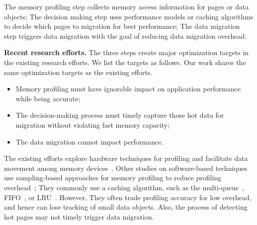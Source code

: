 The memory profiling step collects memory access information for pages or data objects; The decision making step uses performance models or caching algorithms to decide which pages to migration for best performance; The data migration step triggers data migration with the goal of reducing data migration overhead.

\textbf{Recent research efforts.}
The three steps create major optimization targets in the existing research efforts. We list the targets as follows. Our work shares the same optimization targets as the existing efforts.
\begin{itemize}[leftmargin=*]
    \item Memory profiling must have ignorable impact on application performance while being accurate;
    \item The decision-making process must timely capture those hot data for migration without violating fast memory capacity;
    \item The data migration cannot impact  performance. %
\end{itemize}

The existing efforts explore hardware techniques for profiling and facilitate data movement among memory devices~\cite{asplos15:agarwal,hetero_mem_arch,qureshi_micro09, ibm_isca09, Ramos:ics11,gpu_pcm_pact13,hpdc16:wu,row_buffer_pcm_iccd12}. Other studies on software-based techniques use sampling-based approaches for memory profiling to reduce profiling overhead~\cite{Thermostat:asplos17,RAMinate:socc16,heteros:isca17, unimem:sc17, sc18:wu}; They commonly use a caching algorithm, such as the multi-queue~\cite{RAMinate:socc16,Ramos:ics11, 5260554}, FIFO~\cite{Yan:ASPLOS19}, or LRU~\cite{heteros:isca17}. However, They often trade profiling accuracy for low overhead, and hence can lose tracking of small data objects. Also, the process of detecting hot pages may not timely trigger data migration. 

